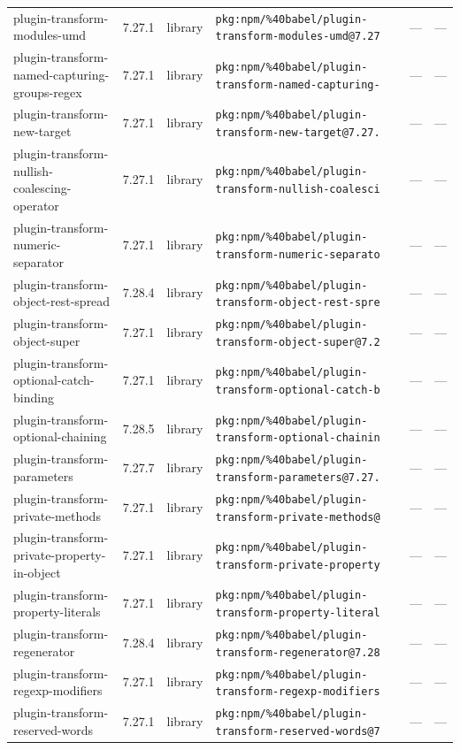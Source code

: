 \documentclass[11pt]{article}
\begin{document}
\begin{longtable}{|l|l|l|p{2.2cm}|l|p{4cm}|}
plugin-transform-modules-umd & 7.27.1 & library & \texttt{pkg:npm/\%40babel/plugin-transform-modules-umd@7.27} & — & — \\
plugin-transform-named-capturing-groups-regex & 7.27.1 & library & \texttt{pkg:npm/\%40babel/plugin-transform-named-capturing-} & — & — \\
plugin-transform-new-target & 7.27.1 & library & \texttt{pkg:npm/\%40babel/plugin-transform-new-target@7.27.} & — & — \\
plugin-transform-nullish-coalescing-operator & 7.27.1 & library & \texttt{pkg:npm/\%40babel/plugin-transform-nullish-coalesci} & — & — \\
plugin-transform-numeric-separator & 7.27.1 & library & \texttt{pkg:npm/\%40babel/plugin-transform-numeric-separato} & — & — \\
plugin-transform-object-rest-spread & 7.28.4 & library & \texttt{pkg:npm/\%40babel/plugin-transform-object-rest-spre} & — & — \\
plugin-transform-object-super & 7.27.1 & library & \texttt{pkg:npm/\%40babel/plugin-transform-object-super@7.2} & — & — \\
plugin-transform-optional-catch-binding & 7.27.1 & library & \texttt{pkg:npm/\%40babel/plugin-transform-optional-catch-b} & — & — \\
plugin-transform-optional-chaining & 7.28.5 & library & \texttt{pkg:npm/\%40babel/plugin-transform-optional-chainin} & — & — \\
plugin-transform-parameters & 7.27.7 & library & \texttt{pkg:npm/\%40babel/plugin-transform-parameters@7.27.} & — & — \\
plugin-transform-private-methods & 7.27.1 & library & \texttt{pkg:npm/\%40babel/plugin-transform-private-methods@} & — & — \\
plugin-transform-private-property-in-object & 7.27.1 & library & \texttt{pkg:npm/\%40babel/plugin-transform-private-property} & — & — \\
plugin-transform-property-literals & 7.27.1 & library & \texttt{pkg:npm/\%40babel/plugin-transform-property-literal} & — & — \\
plugin-transform-regenerator & 7.28.4 & library & \texttt{pkg:npm/\%40babel/plugin-transform-regenerator@7.28} & — & — \\
plugin-transform-regexp-modifiers & 7.27.1 & library & \texttt{pkg:npm/\%40babel/plugin-transform-regexp-modifiers} & — & — \\
plugin-transform-reserved-words & 7.27.1 & library & \texttt{pkg:npm/\%40babel/plugin-transform-reserved-words@7} & — & — \\

\end{longtable}
\end{document}
